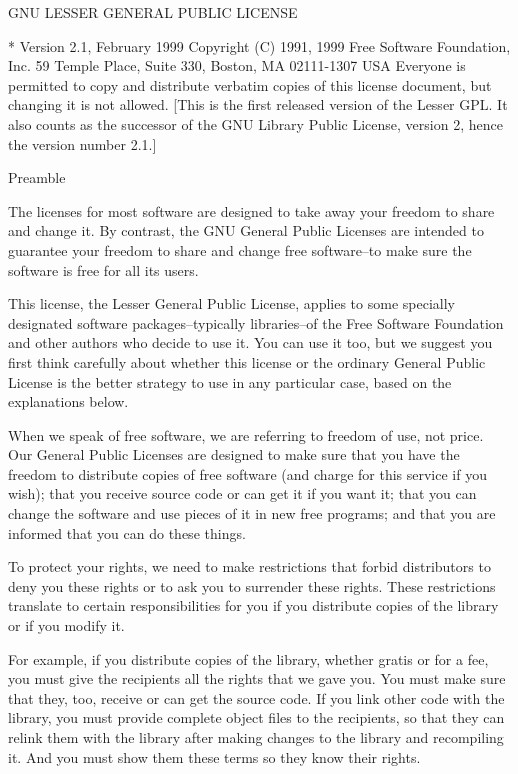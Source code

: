 
GNU LESSER GENERAL PUBLIC LICENSE

    * Version 2.1, February 1999 Copyright (C) 1991, 1999 Free Software Foundation, Inc. 59 Temple Place, Suite 330, Boston, MA 02111-1307 USA Everyone is permitted to copy and distribute verbatim copies of this license document, but changing it is not allowed. [This is the first released version of the Lesser GPL. It also counts as the successor of the GNU Library Public License, version 2, hence the version number 2.1.] 

Preamble

The licenses for most software are designed to take away your freedom to share and change it. By contrast, the GNU General Public Licenses are intended to guarantee your freedom to share and change free software--to make sure the software is free for all its users.

This license, the Lesser General Public License, applies to some specially designated software packages--typically libraries--of the Free Software Foundation and other authors who decide to use it. You can use it too, but we suggest you first think carefully about whether this license or the ordinary General Public License is the better strategy to use in any particular case, based on the explanations below.

When we speak of free software, we are referring to freedom of use, not price. Our General Public Licenses are designed to make sure that you have the freedom to distribute copies of free software (and charge for this service if you wish); that you receive source code or can get it if you want it; that you can change the software and use pieces of it in new free programs; and that you are informed that you can do these things.

To protect your rights, we need to make restrictions that forbid distributors to deny you these rights or to ask you to surrender these rights. These restrictions translate to certain responsibilities for you if you distribute copies of the library or if you modify it.

For example, if you distribute copies of the library, whether gratis or for a fee, you must give the recipients all the rights that we gave you. You must make sure that they, too, receive or can get the source code. If you link other code with the library, you must provide complete object files to the recipients, so that they can relink them with the library after making changes to the library and recompiling it. And you must show them these terms so they know their rights.

